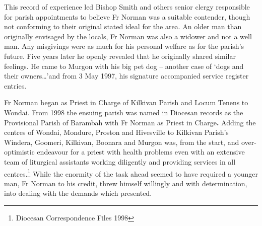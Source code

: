 This record of experience led Bishop Smith and others senior clergy responsible for parish appointments to believe Fr Norman was a suitable contender, though not conforming to their original stated ideal for the area. An older man than originally envisaged by the locals, Fr Norman was also a widower and not a well man. Any misgivings were as much for his personal welfare as for the parish's future. Five years later he openly revealed that he originally shared similar feelings. He came to Murgon with his big pet dog -- another case of `dogs and their owners\ldots'and from 3 May 1997, his signature accompanied service register entries.



Fr Norman began as Priest in Charge of Kilkivan Parish and Locum Tenens to Wondai. From 1998 the ensuing parish was named in Diocesan records as the Provisional Parish of Barambah with Fr Norman as Priest in Charge\textbf{.} Adding the centres of Wondai, Mondure, Proston and Hivesville to Kilkivan Parish's Windera, Goomeri, Kilkivan, Boonara and Murgon was, from the start, and over-optimistic endeavour for a priest with health problems even with an extensive team of liturgical assistants working diligently and providing services in all centres.\footnote{Diocesan Correspondence Files 1998} While the enormity of the task ahead seemed to have required a younger man, Fr Norman to his credit, threw himself willingly and with determination, into dealing with the demands which presented.









